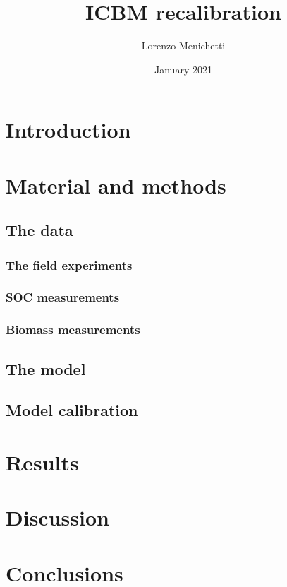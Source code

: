 \documentclass{article}
\title{ICBM recalibration}
\author{Lorenzo Menichetti}
\date{January 2021}
\begin{document}
\maketitle

\section{Introduction}

\section{Material and methods}

\subsection{The data}

\subsubsection{The field experiments}


\subsubsection{SOC measurements}


\subsubsection{Biomass measurements}


\subsection{The model}


\subsection{Model calibration}


\section{Results}

\section{Discussion}

\section{Conclusions}
\end{document}
